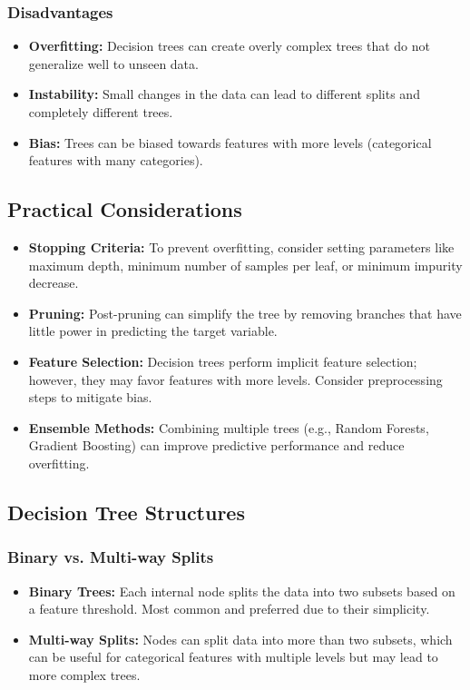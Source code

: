 \documentclass{article}
\begin{document}
\subsubsection{Disadvantages}

\begin{itemize}
    \item \textbf{Overfitting:} Decision trees can create overly complex trees that do not generalize well to unseen data.
    \item \textbf{Instability:} Small changes in the data can lead to different splits and completely different trees.
    \item \textbf{Bias:} Trees can be biased towards features with more levels (categorical features with many categories).
\end{itemize}

\subsection{Practical Considerations}

\begin{itemize}
    \item \textbf{Stopping Criteria:} To prevent overfitting, consider setting parameters like maximum depth, minimum number of samples per leaf, or minimum impurity decrease.
    \item \textbf{Pruning:} Post-pruning can simplify the tree by removing branches that have little power in predicting the target variable.
    \item \textbf{Feature Selection:} Decision trees perform implicit feature selection; however, they may favor features with more levels. Consider preprocessing steps to mitigate bias.
    \item \textbf{Ensemble Methods:} Combining multiple trees (e.g., Random Forests, Gradient Boosting) can improve predictive performance and reduce overfitting.
\end{itemize}

\subsection{Decision Tree Structures}

\subsubsection{Binary vs. Multi-way Splits}

\begin{itemize}
    \item \textbf{Binary Trees:} Each internal node splits the data into two subsets based on a feature threshold. Most common and preferred due to their simplicity.
    \item \textbf{Multi-way Splits:} Nodes can split data into more than two subsets, which can be useful for categorical features with multiple levels but may lead to more complex trees.
\end{itemize}
\end{document}
